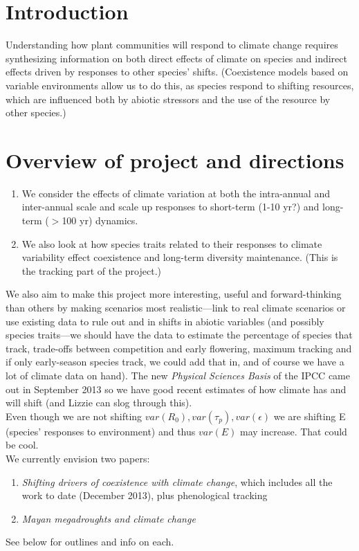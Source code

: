 \documentclass[11pt,a4paper,oneside]{article}
\begin{document}
\section{Introduction}
\noindent Understanding how plant communities will respond to climate change
requires synthesizing information on both direct effects of climate on species
and indirect effects driven by responses to other species'
shifts. (Coexistence models based on variable environments allow us to
do this, as species respond to shifting resources, which are
influenced both by abiotic stressors and the use of the resource by
other species.)

\section{Overview of project and directions}
\noindent 
\begin{enumerate}
\item We consider the effects of climate variation at both the
intra-annual and inter-annual scale and scale up responses to
short-term (1-10 yr?) and long-term (\(>\)100 yr) dynamics. 
\item We also look at how species traits related to their responses to
  climate variability effect coexistence and long-term diversity
  maintenance. (This is the tracking part of the project.) 
\end{enumerate}

\noindent We also aim to make  this project more
interesting, useful and forward-thinking than others by making
scenarios most realistic---link to real climate scenarios or use
existing data to rule out and in shifts in abiotic variables (and
possibly species traits---we should have the data to estimate the
percentage of species that track, trade-offs between competition and early flowering, maximum tracking and if only
early-season species track, we could add that in, and of course we
have a lot of climate data on hand). The new \emph{Physical Sciences Basis} of the IPCC came out in September 2013 so we have good recent estimates of how climate has and will shift (and Lizzie can slog through this).\\

 Even though we are not shifting \(var(R_{0}), var(\tau_{p}), var(\epsilon)\) we are shifting E (species' responses to environment) and thus \(var(E)\) may increase. That could be cool.\\

 We currently envision two papers: 
\begin{enumerate}
\item \emph{Shifting drivers of coexistence with climate change}, which includes all the work to date (December 2013), plus phenological tracking
\item  \emph{Mayan megadroughts and climate change} 
\end{enumerate}
See below for outlines and info on each.
\end{document}
